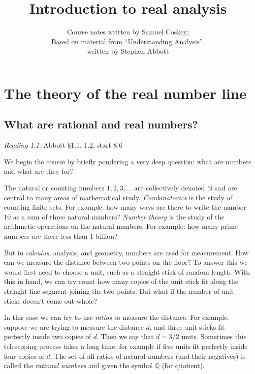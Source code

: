 \documentclass[11pt,oneside]{amsbook}
\title{Introduction to real analysis}
\author{Course notes written by Samuel Coskey;\\Based on material from ``Understanding Analysis'',\\written by Stephen Abbott}
\newcommand{\N}{\mathbb N}
\newcommand{\Q}{\mathbb Q}
\theoremstyle{definition}
\theoremstyle{plain}
\theoremstyle{definition}
\theoremstyle{remark}
\newtheorem*{reading}{Reading}
\numberwithin{equation}{section}
\numberwithin{figure}{section}
\begin{document}
\maketitle

\tableofcontents

\chapter{The theory of the real number line}

\section{What are rational and real numbers?}

\begin{reading}
  Abbott \S 1.1, 1.2, start 8.6
\end{reading}

We begin the course by briefly pondering a very deep question: what are numbers and what are they for?

The natural or counting numbers $1,2,3,\ldots$ are collectively denoted $\N$ and are central to many areas of mathematical study. \emph{Combinatorics} is the study of counting finite sets. For example: how many ways are there to write the number 10 as a sum of three natural numbers? \emph{Number theory} is the study of the arithmetic operations on the natural numbers. For example: how many prime numbers are there less than 1 billion?

But in \emph{calculus}, analysis, and geometry, numbers are used for measurement. How can we measure the distance between two points on the floor? To answer this we would first need to choose a unit, such as a straight stick of random length. With this in hand, we can try count how many copies of the unit stick fit along the striaght line segment joining the two points. But what if the number of unit sticks doesn't come out whole?

In this case we can try to use \emph{ratios} to measure the distance. For example, suppose we are trying to measure the distance $d$, and three unit sticks fit perfectly inside two copies of $d$. Then we say that $d=3/2$ units. Sometimes this telescoping process takes a long time, for example if five units fit perfectly inside four copies of $d$. The set of all ratios of natural numbers (and their negatives) is called the \emph{rational numbers} and given the symbol $\Q$ (for quotient).
\end{document}
